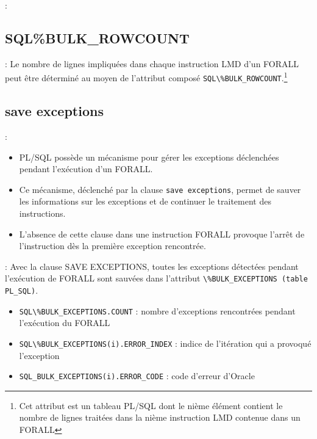 \documentclass[10pt]{beamer}
\begin{document}
\begin{frame}[allowframebreaks]{\secname : \subsecname}
    
\end{frame}

\subsection{SQL\%BULK\_ROWCOUNT}
\begin{frame}{\secname : \subsecname}
    Le nombre de lignes impliquées dans chaque instruction LMD d'un FORALL peut être déterminé au moyen de l'attribut composé \lstinline[language=plsql]!SQL\%BULK_ROWCOUNT!.\footnote{Cet attribut est un tableau PL/SQL dont le nième élément contient le nombre de lignes traitées dans la nième instruction LMD contenue dans un FORALL}
\end{frame}

\subsection{save exceptions}
\begin{frame}{\secname : \subsecname}
    \begin{itemize}
        \item PL/SQL possède un mécanisme pour gérer les exceptions déclenchées pendant l'exécution d'un FORALL.
        \item Ce mécanisme, déclenché par la clause \lstinline[language=plsql]!save exceptions!, permet de sauver les informations sur les exceptions et de continuer le traitement des instructions.
        \item L'absence de cette clause dans une instruction FORALL provoque l'arrêt de l'instruction dès la première exception rencontrée.
    \end{itemize}
\end{frame}


\begin{frame}{\secname : \subsecname}
    Avec la clause SAVE EXCEPTIONS, toutes les exceptions détectées pendant l'exécution de FORALL sont sauvées dans l'attribut \lstinline   [language=plsql]!\%BULK_EXCEPTIONS (table PL_SQL)!.
    \begin{itemize}
        \item \lstinline[language=plsql]!SQL\%BULK_EXCEPTIONS.COUNT! : nombre d'exceptions rencontrées pendant l'exécution du FORALL
        \item \lstinline[language=plsql]!SQL\%BULK_EXCEPTIONS(i).ERROR_INDEX! : indice de l'itération qui a provoqué l'exception
        \item \lstinline[language=plsql]!SQL_BULK_EXCEPTIONS(i).ERROR_CODE! : code d'erreur d'Oracle
    \end{itemize}
\end{frame}
\end{document}
